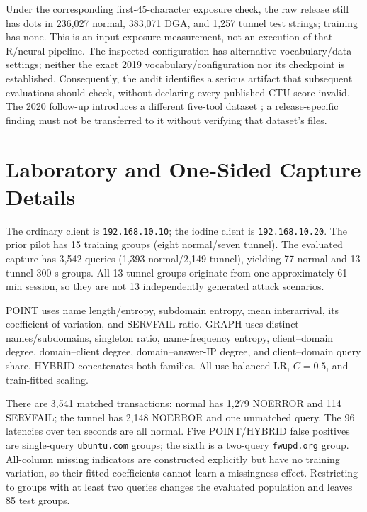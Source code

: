 \documentclass[conference]{IEEEtran}
\newcommand{\code}[1]{\texttt{#1}}
\begin{document}
Under the corresponding first-45-character exposure check, the raw release still has dots in 236,027 normal, 383,071 DGA, and 1,257 tunnel test strings; training has none. This is an input exposure measurement, not an execution of that R/neural pipeline. The inspected configuration has alternative vocabulary/data settings; neither the exact 2019 vocabulary/configuration nor its checkpoint is established. Consequently, the audit identifies a serious artifact that subsequent evaluations should check, without declaring every published CTU score invalid. The 2020 follow-up introduces a different five-tool dataset \cite{palau2020}; a release-specific finding must not be transferred to it without verifying that dataset's files.

\FloatBarrier
\section{Laboratory and One-Sided Capture Details}
\begin{table}[!htbp]
\caption{LAB zero/median replay on all 90 evaluation groups. Full CSV outputs additionally include missingness indicators and restricted-population diagnostics.}

\end{table}
The ordinary client is \code{192.168.10.10}; the iodine client is \code{192.168.10.20}. The prior pilot has 15 training groups (eight normal/seven tunnel). The evaluated capture has 3,542 queries (1,393 normal/2,149 tunnel), yielding 77 normal and 13 tunnel 300-s groups. All 13 tunnel groups originate from one approximately 61-min session, so they are not 13 independently generated attack scenarios.

POINT uses name length/entropy, subdomain entropy, mean interarrival, its coefficient of variation, and SERVFAIL ratio. GRAPH uses distinct names/subdomains, singleton ratio, name-frequency entropy, client--domain degree, domain--client degree, domain--answer-IP degree, and client--domain query share. HYBRID concatenates both families. All use balanced LR, $C=0.5$, and train-fitted scaling.

\begin{table}[!htbp]
\caption{Graph-family deletions in the observed laboratory scenario. The complete CSV also includes minimal-diversity and point/hybrid controls.}

\end{table}
There are 3,541 matched transactions: normal has 1,279 NOERROR and 114 SERVFAIL; the tunnel has 2,148 NOERROR and one unmatched query. The 96 latencies over ten seconds are all normal. Five POINT/HYBRID false positives are single-query \code{ubuntu.com} groups; the sixth is a two-query \code{fwupd.org} group. All-column missing indicators are constructed explicitly but have no training variation, so their fitted coefficients cannot learn a missingness effect. Restricting to groups with at least two queries changes the evaluated population and leaves 85 test groups.
\end{document}
